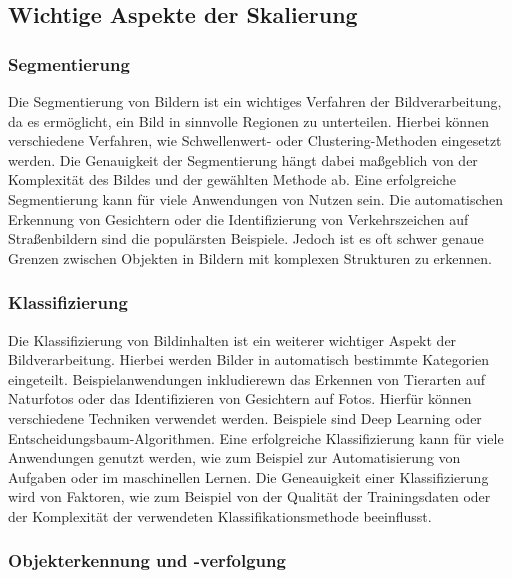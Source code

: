 \subsection{Wichtige Aspekte der Skalierung}
    \subsubsection{Segmentierung}
    
        Die Segmentierung von Bildern ist ein wichtiges Verfahren der Bildverarbeitung, da es ermöglicht, ein Bild in sinnvolle Regionen zu unterteilen. 
        Hierbei können verschiedene Verfahren, wie Schwellenwert- oder Clustering-Methoden eingesetzt werden. 
        Die Genauigkeit der Segmentierung hängt dabei maßgeblich von der Komplexität des Bildes und der gewählten Methode ab.
        Eine erfolgreiche Segmentierung kann für viele Anwendungen von Nutzen sein.
        Die automatischen Erkennung von Gesichtern oder die Identifizierung von Verkehrszeichen auf Straßenbildern sind die populärsten Beispiele.
        Jedoch ist es oft schwer genaue Grenzen zwischen Objekten in Bildern mit komplexen Strukturen zu erkennen.
    
    \subsubsection{Klassifizierung}
    
        Die Klassifizierung von Bildinhalten ist ein weiterer wichtiger Aspekt der Bildverarbeitung.
        Hierbei werden Bilder in automatisch bestimmte Kategorien eingeteilt. 
        Beispielanwendungen inkludierewn das Erkennen von Tierarten auf Naturfotos oder das Identifizieren von Gesichtern auf Fotos. 
        Hierfür können verschiedene Techniken verwendet werden. Beispiele sind Deep Learning oder Entscheidungsbaum-Algorithmen.
        Eine erfolgreiche Klassifizierung kann für viele Anwendungen genutzt werden, wie zum Beispiel zur Automatisierung von Aufgaben oder im maschinellen Lernen. 
        Die Geneauigkeit einer Klassifizierung wird von Faktoren, wie zum Beispiel von der Qualität der Trainingsdaten oder der Komplexität der verwendeten Klassifikationsmethode beeinflusst.
    
    \subsubsection{Objekterkennung und -verfolgung}
    
